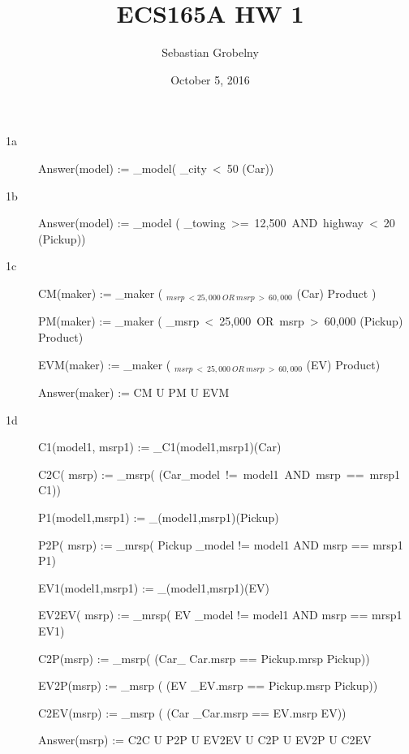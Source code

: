 \documentclass[12pt]{article}
\title{ECS165A HW 1 }
\author{Sebastian Grobelny}
\date{October 5, 2016 }
\begin{document}
\maketitle
\vspace{-1em}
\begin{description}
\item[1a ] $ $ \\

Answer(model) := \Pi_{model}( \sigma _{city\ <\ 50} (Car))


\clearpage
\item[1b ] $ $ \\
Answer(model) := \Pi_{model} ( \sigma _{towing\ >=\ 12,500\ AND\ highway\ <\ 20} (Pickup))


\clearpage
\item[1c ] $ $ \\
CM(maker) := \Pi_{maker} ( \sigma $_{msrp\ < 25,000\ OR\ msrp\ >\ 60,000}$ (Car) \bowtie Product )


PM(maker) := \Pi_{maker} ( \sigma _{msrp\ <\ 25,000\ OR\ msrp\ >\ 60,000} (Pickup) \bowtie Product)


EVM(maker) := \Pi_{maker} ( \sigma $_{msrp\ <\ 25,000\ OR\ msrp\ >\ 60,000}$ (EV) \bowtie Product)



Answer(maker) := CM U PM U EVM


\clearpage
\item[1d ] $ $ \\
    C1(model1, msrp1) :=  \rho_{C1}(model1,msrp1)(Car)


C2C( msrp) := \Pi_{msrp}( (Car\bowtie_{model\ !=\ model1\ AND\ msrp\ ==\ mrsp1} C1))


P1(model1,msrp1) := \rho_{(model1,msrp1)}(Pickup)


P2P( msrp) := \Pi_{mrsp}( Pickup \bowtie_{model != model1 AND msrp == mrsp1} P1)

EV1(model1,msrp1) := \rho_{(model1,msrp1)}(EV)


EV2EV( msrp) := \Pi_{mrsp}( EV \bowtie_{model != model1 AND msrp == mrsp1} EV1)


C2P(msrp) := \Pi_{msrp}( (Car\bowtie_{ Car.msrp == Pickup.mrsp} Pickup))

EV2P(msrp) := \Pi_{msrp} ( (EV \bowtie_{EV.msrp == Pickup.msrp} Pickup))

C2EV(msrp) := \Pi_{msrp} ( (Car \bowtie_{Car.msrp == EV.msrp} EV))


Answer(msrp) := C2C U P2P U EV2EV U C2P U EV2P U C2EV




\end{description}
\end{document}
